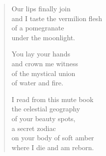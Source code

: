 \documentclass[twocolumn,11pt]{article}
\begin{document}
\begin{verse}
  Our lips finally join \\
  and I taste the vermilion flesh\\
  of a pomegranate \\
  under the moonlight.

  You lay your hands \\
  and crown me witness \\
  of the mystical union \\
  of water and fire.

  I read from this mute book \\
  the celestial geography \\
  of your beauty spots, \\
  a secret zodiac \\
  on your body of soft amber \\
  where I die and am reborn.
\end{verse}
\end{document}
